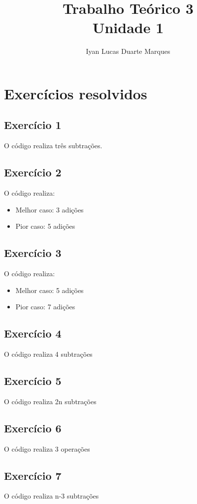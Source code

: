 \documentclass[12pt]{article}
\begin{document}
\title{Trabalho Teórico 3\\Unidade 1}

\author{Iyan Lucas Duarte Marques}



\maketitle

\section{Exercícios resolvidos}
\subsection{Exercício 1}
O código realiza três subtrações.
\subsection{Exercício 2}
O código realiza:
\begin{itemize}
  \item Melhor caso: 3 adições
  \item Pior caso: 5 adições
\end{itemize}
\subsection{Exercício 3}
O código realiza:
\begin{itemize}
  \item Melhor caso: 5 adições
  \item Pior caso: 7 adições
\end{itemize}
\subsection{Exercício 4}
O código realiza 4 subtrações
\subsection{Exercício 5}
O código realiza 2n subtrações
\subsection{Exercício 6}
O código realiza 3 operações
\subsection{Exercício 7}
O código realiza n-3 subtrações
\end{document}
